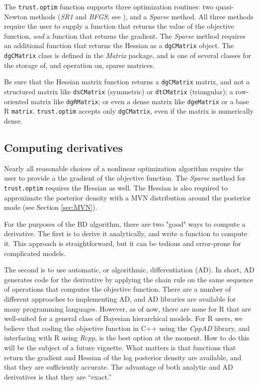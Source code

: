 \documentclass[10pt]{article}\usepackage[]{graphicx}\usepackage[]{color}
\newcommand{\pkg}[1]{\emph{#1}}
\newcommand{\proglang}[1]{\textsf{#1}}
\newcommand{\func}[1]{\texttt{#1}}
\newcommand{\class}[1]{\texttt{#1}}
\newcommand{\method}[1]{\textsl{#1}}
\begin{document}
The \func{trust.optim} function supports three optimization routines:
two quasi-Newton methods (\method{SR1} and \method{BFGS}; see
\citet{NocedalWright2006}), and a \method{Sparse} method.  All three
methods require the user to supply a function that returns the value
of the objective function, \emph{and} a function that returns the
gradient.  The \method{Sparse} method requires an additional function
that returns the Hessian as a \class{dgCMatrix} object.  The
\class{dgCMatrix} class is defined in the \pkg{Matrix} package, and is
one of several classes for the storage of, and operation on, sparse
matrices.

Be sure that the Hessian matrix function returns a
\class{dgCMatrix} matrix, and not a structured matrix like
\class{dsCMatrix} (symmetric) or \class{dtCMatrix} (triangular); a
row-oriented matrix like \class{dgRMatrix}; or even a dense matrix
like \class{dgeMatrix} or a base \proglang{R} \class{matrix}.
\func{trust.optim} accepts only \class{dgCMatrix}, even if the matrix
is numerically dense.


\subsection{Computing derivatives}\label{sec:derivatives}


Nearly all reasonable choices of a nonlinear optimization algorithm
require the user to provide a the gradient of the objective function.
The \method{Sparse} method for \func{trust.optim} requires the Hessian as well.  The Hessian is
also required to approximate the posterior density with a MVN
distribution around the posterior mode (see Section \ref{sec:MVN}).

For the purposes of the BD algorithm, there are two "good" ways to
compute a derivative. The first is to derive
it analytically, and write a function to compute it.  This approach is
straightforward, but it can be tedious and error-prone for complicated models.

The second is to use automatic,
or algorithmic, differentiation (AD).  In short, AD generates
code for the derivative by applying the chain rule on the same sequence of operations
that computes the objective function.  There are a number of different approaches to
implementing AD, and AD libraries are available for
many programming languages.  However, as of now, there are none for \proglang{R} that are
well-suited for a general class of Bayesian hierarchical models.  For
\proglang{R} users, we believe that coding the objective function in \proglang{C++} using the
\pkg{CppAD} library, and interfacing with \proglang{R} using \pkg{Rcpp}, is the best option
at the moment.  How to do this will be the subject of a future
vignette.  What matters is that functions that return the gradient and
Hessian of the log posterior density are available, and that they are sufficiently
accurate.  The advantage of both analytic and AD derivatives is that they are ``exact.''
\end{document}
